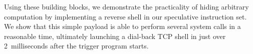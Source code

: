 Using these building blocks, we demonstrate the practicality of hiding arbitrary
computation by implementing a reverse shell in our speculative instruction set.
We show that this simple payload is able to perform several system calls in a
reasonable time, ultimately launching a dial-back TCP shell in just over
2~milliseconds after the trigger program starts.










